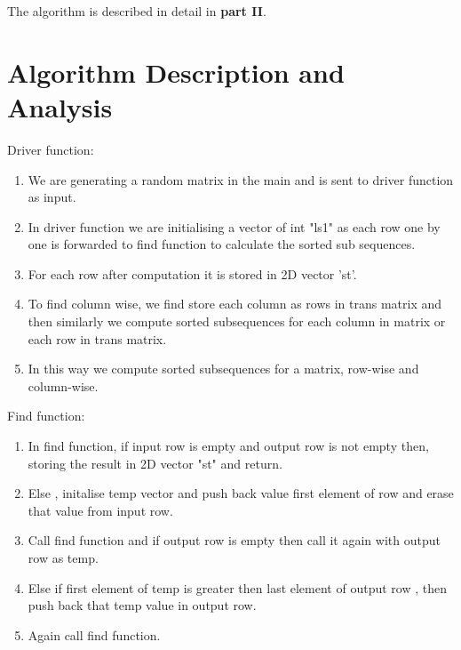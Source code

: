 \documentclass[conference]{IEEEtran}
\begin{document}
\noindent The algorithm  is described in detail in \textbf{part II}.\\

\section{\textbf {Algorithm Description and Analysis}}

 Driver function:\\
\begin{enumerate}

\item We are  generating a random matrix in the main and is sent to driver function as input.\\

\item In driver function we are initialising a vector of int "ls1" as each row one by one is forwarded to find function to calculate the sorted sub sequences.\\

\item For each row after computation it is stored in 2D vector 'st'.
\\

\item To find column wise, we find store each column as rows in trans matrix and then similarly we compute sorted subsequences for each column in matrix or each row in trans matrix. \\

\item In this way we compute sorted subsequences for a matrix, row-wise and column-wise.\\

\end{enumerate}

 Find function: \\

\begin{enumerate}

\item In find function, if input row is empty and output row is not empty then, storing the result in 2D vector  "st" and return.\\

\item Else , initalise temp vector and push back value first element of row and erase that value from input row.\\

\item Call find function and if output row is empty then call it again with output row as temp.\\

\item Else if first element of temp is greater then last element of output row , then push back that temp value in output row.\\

\item Again call find function. \\

\end{enumerate}
\end{document}
